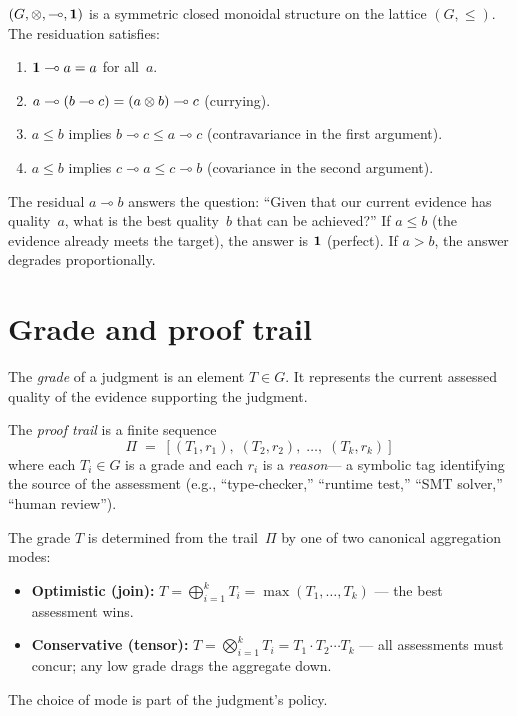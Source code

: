\begin{theorem}
\label{thm:closed-monoidal}
$(G, \otimes, \multimap, \mathbf{1})$ is a symmetric closed monoidal structure
on the lattice $(G, \leq)$.  The residuation satisfies:
\begin{enumerate}[label=(\alph*),nosep]
\item $\mathbf{1} \multimap a = a$ for all~$a$.
\item $a \multimap (b \multimap c) = (a \otimes b) \multimap c$
  (currying).
\item $a \leq b$ implies $b \multimap c \leq a \multimap c$
  (contravariance in the first argument).
\item $a \leq b$ implies $c \multimap a \leq c \multimap b$
  (covariance in the second argument).
\end{enumerate}
\end{theorem}

\begin{remark}[Interpretation]
The residual $a \multimap b$ answers the question: ``Given that our
current evidence has quality~$a$, what is the best quality~$b$ that
can be achieved?''  If $a \leq b$ (the evidence already meets the
target), the answer is $\mathbf{1}$ (perfect).  If $a > b$, the answer
degrades proportionally.
\end{remark}

\section{Grade and proof trail}
\label{sec:grade-trail}

\begin{definition}[Grade]
\label{def:grade}
The \emph{grade} of a judgment is an element $T \in G$.  It represents
the current assessed quality of the evidence supporting the judgment.
\end{definition}

\begin{definition}
\label{def:trail}
The \emph{proof trail} is a finite sequence
\[
  \Pi \;=\; [(T_1, r_1),\; (T_2, r_2),\; \ldots,\; (T_k, r_k)]
\]
where each $T_i \in G$ is a grade and each $r_i$ is a \emph{reason}---
a symbolic tag identifying the source of the assessment (e.g.,
``type-checker,'' ``runtime test,'' ``SMT solver,'' ``human review'').
\end{definition}

\begin{definition}
\label{def:aggregation}
The grade $T$ is determined from the trail~$\Pi$ by one of two
canonical aggregation modes:
\begin{itemize}[nosep]
\item \textbf{Optimistic (join):}
  $T = \bigoplus_{i=1}^{k} T_i = \max(T_1, \ldots, T_k)$ ---
  the best assessment wins.
\item \textbf{Conservative (tensor):}
  $T = \bigotimes_{i=1}^{k} T_i = T_1 \cdot T_2 \cdots T_k$ ---
  all assessments must concur; any low grade drags the aggregate down.
\end{itemize}
The choice of mode is part of the judgment's policy.
\end{definition}

